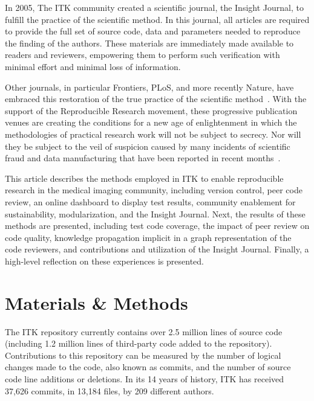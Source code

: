 \documentclass{frontiersENG} %
\begin{document}
In 2005, The ITK community created a scientific journal, the Insight Journal,
to fulfill the practice of the scientific method.  In this journal, all
articles are required to provide the full set of source code, data and
parameters needed to reproduce the finding of the authors. These materials are
immediately made available to readers and reviewers, empowering them to
perform such verification with minimal effort and minimal loss of information.

Other journals, in particular Frontiers, PLoS, and more recently Nature, have
embraced this restoration of the true practice of the scientific
method~\cite{Stodden2013,NatureEditorial2013,NatureEditorial2012,Mobley2013}.  With the
support of the Reproducible Research movement, these progressive publication
venues are creating the conditions for a new age of enlightenment in which the
methodologies of practical research work will not be subject to secrecy. Nor
will they be subject to the veil of suspicion caused by many incidents of scientific fraud and
data manufacturing that have been reported in recent months~\cite{Sandve2013}.

%
%

This article describes the methods employed in ITK to enable reproducible
research in the medical imaging community, including version control, peer code
review, an online dashboard to display test results, community enablement for
sustainability, modularization, and the Insight Journal.  Next, the results of
these methods are presented, including test code coverage, the impact of peer
review on code quality, knowledge propagation implicit in a graph
representation of the code reviewers, and contributions and utilization of the
Insight Journal.  Finally, a high-level reflection on these experiences is
presented.



\section{Materials \& Methods}

The ITK repository currently contains over 2.5 million lines of source code
(including 1.2 million lines of third-party code added to the repository).
Contributions to this repository can be measured by the number of logical
changes made to the code, also known as commits, and the number of source code
line additions or deletions. In its 14 years of history, ITK has received
37,626 commits, in 13,184 files, by 209 different authors.
\end{document}
